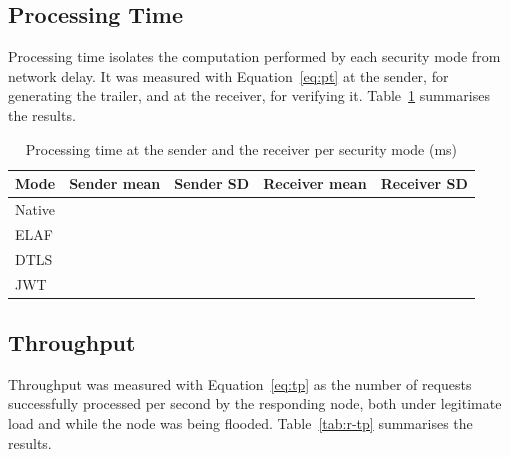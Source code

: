 \subsection{Processing Time}
\label{sec:r-pt}

Processing time isolates the computation performed by each security mode from network delay. It was measured with Equation~\ref{eq:pt} at the sender, for generating the trailer, and at the receiver, for verifying it. Table~\ref{tab:r-pt} summarises the results.

\begin{table}[htbp]
  \centering
  \caption{Processing time at the sender and the receiver per security mode (ms)}
  \label{tab:r-pt}
  \renewcommand{\arraystretch}{1.2}
  \begin{tabularx}{\textwidth}{@{}X c c c c@{}}
    \toprule
    \textbf{Mode} & \textbf{Sender mean} & \textbf{Sender SD} & \textbf{Receiver mean} & \textbf{Receiver SD} \\
    \midrule
    Native        & \tbd{}               & \tbd{}             & \tbd{}                 & \tbd{}               \\
    ELAF          & \tbd{}               & \tbd{}             & \tbd{}                 & \tbd{}               \\
    DTLS          & \tbd{}               & \tbd{}             & \tbd{}                 & \tbd{}               \\
    JWT           & \tbd{}               & \tbd{}             & \tbd{}                 & \tbd{}               \\
    \bottomrule
  \end{tabularx}
\end{table}

\subsection{Throughput}
\label{sec:r-tp}

Throughput was measured with Equation~\ref{eq:tp} as the number of requests successfully processed per second by the responding node, both under legitimate load and while the node was being flooded. Table~\ref{tab:r-tp} summarises the results.

